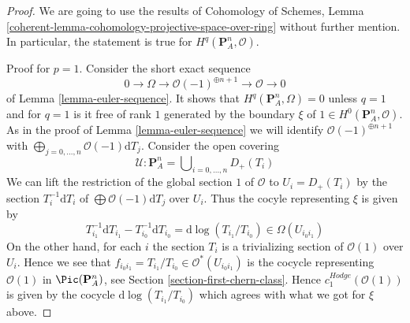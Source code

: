\begin{proof}
We are going to use the results of Cohomology of Schemes, Lemma
\ref{coherent-lemma-cohomology-projective-space-over-ring}
without further mention. In particular, the statement is true
for $H^q(\mathbf{P}^n_A, \mathcal{O})$.

\medskip\noindent
Proof for $p = 1$. Consider the short exact sequence
$$
0 \to \Omega \to \mathcal{O}(-1)^{\oplus n + 1} \to \mathcal{O} \to 0
$$
of Lemma \ref{lemma-euler-sequence}. It shows that
$H^q(\mathbf{P}^n_A, \Omega) = 0$ unless $q = 1$ and for $q = 1$
is it free of rank $1$ generated by the boundary $\xi$ of
$1 \in H^0(\mathbf{P}^n_A, \mathcal{O})$. As in the proof of
Lemma \ref{lemma-euler-sequence} we will identify
$\mathcal{O}(-1)^{\oplus n + 1}$ with
$\bigoplus_{j = 0, \ldots, n} \mathcal{O}(-1)\text{d}T_j$.
Consider the open covering
$$
\mathcal{U} : 
\mathbf{P}^n_A =
\bigcup\nolimits_{i = 0, \ldots, n} D_{+}(T_i)
$$
We can lift the restriction of the global section $1$ of $\mathcal{O}$
to $U_i = D_+(T_i)$ by the section $T_i^{-1} \text{d}T_i$ of
$\bigoplus \mathcal{O}(-1)\text{d}T_j$ over $U_i$. Thus the cocyle
representing $\xi$ is given by
$$
T_{i_1}^{-1} \text{d}T_{i_1} - T_{i_0}^{-1} \text{d}T_{i_0} =
\text{d}\log(T_{i_1}/T_{i_0}) \in \Omega(U_{i_0i_1})
$$
On the other hand, for each $i$ the section $T_i$ is a trivializing
section of $\mathcal{O}(1)$ over $U_i$. Hence we see that
$f_{i_0i_1} = T_{i_1}/T_{i_0} \in \mathcal{O}^*(U_{i_0i_1})$
is the cocycle representing $\mathcal{O}(1)$ in $\Pic(\mathbf{P}^n_A)$,
see Section \ref{section-first-chern-class}.
Hence $c_1^{Hodge}(\mathcal{O}(1))$
is given by the cocycle $\text{d}\log(T_{i_1}/T_{i_0})$
which agrees with what we got for $\xi$ above.


\end{proof}
